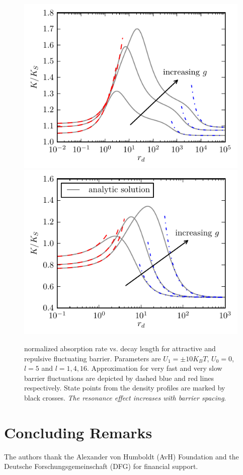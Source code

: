 \documentclass[twocolumn,superscriptaddress]{revtex4}
\begin{document}
\begin{figure}[H]
\includegraphics[width= .5 \textwidth]{plots/g2_ab_rates.pdf}
\includegraphics[width= .5 \textwidth]{plots/g2_rb_rates.pdf}
\caption{normalized absorption rate vs. decay length for attractive and repulsive fluctuating barrier. \newline Parameters are $U_1 = \pm 10 K_B T$, $U_0= 0$, $l = 5$ and $l=1,4,16$. Approximation for very fast and very slow barrier fluctuations are depicted by dashed blue and red lines respectively. State points from the density profiles are marked by black crosses. \emph{The resonance effect increases with barrier spacing}.}
\label{fig3d}
\end{figure}

\section{Concluding Remarks}

\acknowledgments
The authors thank the Alexander von Humboldt (AvH) Foundation and the Deutsche Forschungsgemeinschaft (DFG) 
for financial support. 


\end{document}
